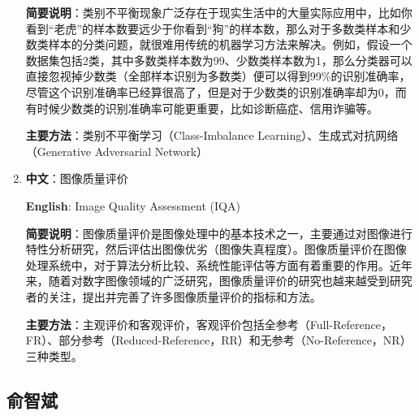 \documentclass[14pt,a4paper]{extarticle}
\begin{document}
\begin{enumerate}
\textbf{简要说明}：类别不平衡现象广泛存在于现实生活中的大量实际应用中，比如你看到“老虎”的样本数要远少于你看到“狗”的样本数，那么对于多数类样本和少数类样本的分类问题，就很难用传统的机器学习方法来解决。例如，假设一个数据集包括2类，其中多数类样本数为99、少数类样本数为1，那么分类器可以直接忽视掉少数类（全部样本识别为多数类）便可以得到99\%的识别准确率，尽管这个识别准确率已经算很高了，但是对于少数类的识别准确率却为0，而有时候少数类的识别准确率可能更重要，比如诊断癌症、信用诈骗等。

\textbf{主要方法}：类别不平衡学习（Class-Imbalance Learning）、生成式对抗网络（Generative Adversarial Network）
\item \textbf{中文}：图像质量评价

\textbf{English}: Image Quality Assessment (IQA)

\textbf{简要说明}：图像质量评价是图像处理中的基本技术之一，主要通过对图像进行特性分析研究，然后评估出图像优劣（图像失真程度）。图像质量评价在图像处理系统中，对于算法分析比较、系统性能评估等方面有着重要的作用。近年来，随着对数字图像领域的广泛研究，图像质量评价的研究也越来越受到研究者的关注，提出并完善了许多图像质量评价的指标和方法。

\textbf{主要方法}：主观评价和客观评价，客观评价包括全参考（Full-Reference，FR）、部分参考（Reduced-Reference，RR）和无参考（No-Reference，NR）三种类型。
\end{enumerate}

\subsection{俞智斌}
\end{document}
